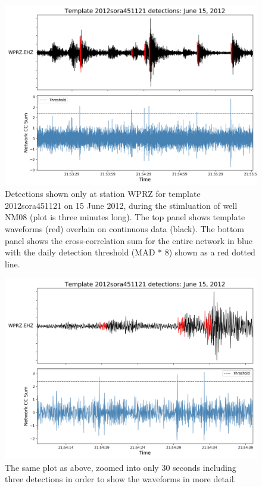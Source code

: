 \begin{figure}[h!]
\begin{center}
\includegraphics[width=0.70\columnwidth]{Chapter_2_Data/figures/2012sora451121_dets_cc_example/2012sora451121_dets_cc_example}
\caption[Example matched-filter detected waveforms]{{
Detections shown only at station WPRZ for template 2012sora451121 on 15
June 2012, during the stimluation of well NM08 (plot is three minutes
long). The top panel shows template waveforms (red) overlain on
continuous data (black). The bottom panel shows the cross-correlation
sum for the entire network in blue with the daily detection threshold
(MAD * 8) shown as a red dotted line.
{\label{434259}}%
}}
\end{center}
\end{figure}


\begin{figure}[h!]
\begin{center}
\includegraphics[width=0.70\columnwidth]{Chapter_2_Data/figures/2012sora451121_dets_cc_example_zoomed/2012sora451121_dets_cc_example_zoomed}
\caption[Close-up of matched-filter detections]{{
The same plot as above, zoomed into only 30 seconds including three
detections in order to show the waveforms in more detail.
{\label{233225}}%
}}
\end{center}
\end{figure}



